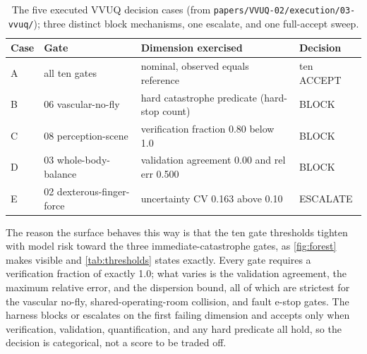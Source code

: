 \begin{table}[H]
\caption{The five executed VVUQ decision cases (from
\texttt{papers/VVUQ-02/execution/03-vvuq/}); three distinct block mechanisms, one
escalate, and one full-accept sweep.}
\label{tab:decisionsurface}
\centering
\footnotesize
\begin{tabularx}{\textwidth}{L{0.6cm} L{4.3cm} Y L{1.9cm}}
\toprule
\textbf{Case} & \textbf{Gate} & \textbf{Dimension exercised} & \textbf{Decision} \\
\midrule
A & all ten gates & nominal, observed equals reference & ten ACCEPT \\
B & 06 vascular-no-fly & hard catastrophe predicate (hard-stop count) & BLOCK \\
C & 08 perception-scene & verification fraction 0.80 below 1.0 & BLOCK \\
D & 03 whole-body-balance & validation agreement 0.00 and rel err 0.500 & BLOCK \\
E & 02 dexterous-finger-force & uncertainty CV 0.163 above 0.10 & ESCALATE \\
\bottomrule
\end{tabularx}
\end{table}

The reason the surface behaves this way is that the ten gate thresholds tighten
with model risk toward the three immediate-catastrophe gates, as
\autoref{fig:forest} makes visible and \autoref{tab:thresholds} states exactly.
Every gate requires a verification fraction of exactly 1.0; what varies is the
validation agreement, the maximum relative error, and the dispersion bound, all
of which are strictest for the vascular no-fly, shared-operating-room collision,
and fault e-stop gates. The harness blocks or escalates on the first failing
dimension and accepts only when verification, validation, quantification, and any
hard predicate all hold, so the decision is categorical, not a score to be traded
off.

\clearpage

